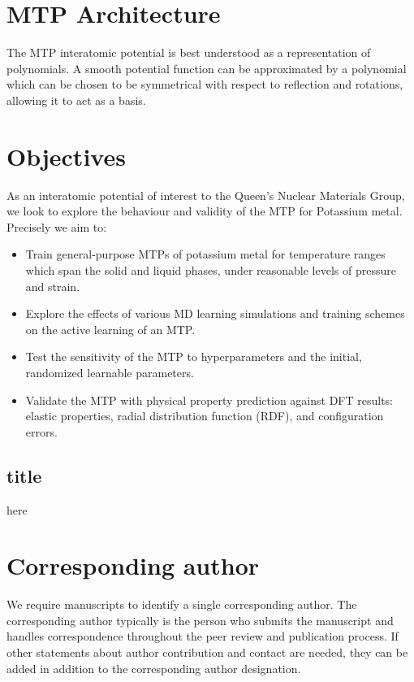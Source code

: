 \documentclass[9pt,twocolumn,twoside]{opticajnl}
\begin{document}
\section{MTP Architecture}
The MTP interatomic potential is best understood as a representation of polynomials. A smooth potential function can be approximated by a polynomial which can be chosen to be symmetrical with respect to reflection and rotations, allowing it to act as a basis.


\section{Objectives}
As an interatomic potential of interest to the Queen's Nuclear Materials Group, we look to explore the behaviour and validity of the MTP for Potassium metal. Precisely we aim to:
\begin{itemize}
  \itemsep0em
  \item Train general-purpose MTPs of potassium metal for temperature ranges which span the solid and liquid phases, under reasonable levels of pressure and strain. 
  \item Explore the effects of various MD learning simulations and training schemes on the active learning of an MTP.
  \item  Test the sensitivity of the MTP to hyperparameters and the initial, randomized learnable parameters. 
  \item Validate the MTP with physical property prediction against DFT results: elastic properties, radial distribution function (RDF), and configuration errors.
\end{itemize}

\subsection[short]{title}{here}

\section{Corresponding author}

We require manuscripts to identify a single corresponding author. The corresponding author typically is the person who submits the manuscript and handles correspondence throughout the peer review and publication process. If other statements about author contribution and contact are needed, they can be added in addition to the corresponding author designation.

\end{document}
